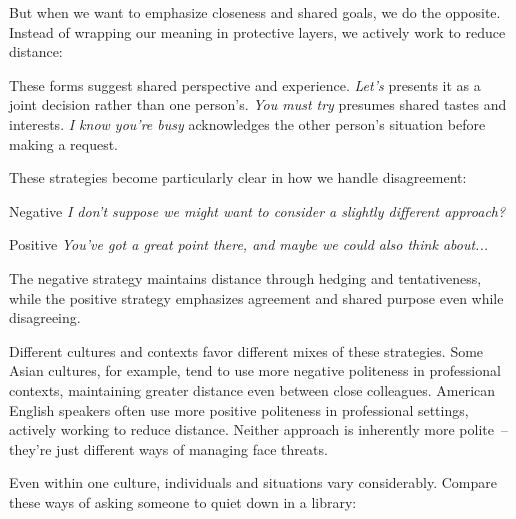 But when we want to emphasize closeness and shared goals, we do the opposite. Instead of wrapping our meaning in protective layers, we actively work to reduce distance:

\ea
    \z
\z

These forms suggest shared perspective and experience. \textit{Let's} presents it as a joint decision rather than one person's. \textit{You must try} presumes shared tastes and interests. \textit{I know you're busy} acknowledges the other person's situation before making a request.

These strategies become particularly clear in how we handle disagreement:

\begin{dialogue}
\item[Negative] \textit{I don't suppose we might want to consider a slightly different approach?}
\item[Positive] \textit{You've got a great point there, and maybe we could also think about...}
\end{dialogue}

The negative strategy maintains distance through hedging and tentativeness, while the positive strategy emphasizes agreement and shared purpose even while disagreeing.

Different cultures and contexts favor different mixes of these strategies. Some Asian cultures, for example, tend to use more negative politeness in professional contexts, maintaining greater distance even between close colleagues. American English speakers often use more positive politeness in professional settings, actively working to reduce distance. Neither approach is inherently more polite~-- they're just different ways of managing face threats.

Even within one culture, individuals and situations vary considerably. Compare these ways of asking someone to quiet down in a library:

\ea
    \z
\z

